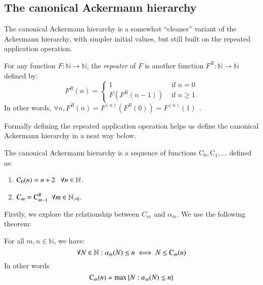 \subsection{The canonical Ackermann hierarchy}

The canonical Ackermann hierarchy is a somewhat ``cleaner'' 
variant of the Ackermann hierarchy, with simpler initial 
values, but still built on the repeated application operation.

\begin{defn} \label{defn: rep_app}
For any function $F: \mathbb{N} \to \mathbb{N}$, the 
\textit{repeater} of $F$ is another function $F^R : 
\mathbb{N} \to \mathbb{N}$ defined by:
\begin{equation}
F^R(n) = \begin{cases}
1 & \text{ if } n = 0 \\ F\left(F^R(n - 1)\right) & \text{ if } n \ge 1
\end{cases}
\end{equation}
In other words, $\forall n, F^R(n) = F^{(n)}\left(F^R(0)\right) = F^{(n)}(1) \ \ $.
\end{defn}

Formally defining the repeated application operation 
helps us define the canonical Ackermann hierarchy in 
a neat way below.

\begin{defn} \label{defn: can_ack_hier}
The canonical Ackermann hierarchy is a sequence of 
functions $\text{C}_0, \text{C}_1, \ldots $ defined as:
\begin{enumerate}
	\item $\text{C}_0(n) = n + 2 \ \ \ \forall n\in \mathbb{N}$.
	\item $\text{C}_m = \text{C}_{m-1}^R \ \ \forall m\in \mathbb{N}_{>0}$.
\end{enumerate}
\end{defn}

Firstly, we explore the relationship between $C_m$ and 
$\alpha_m$. We use the following theorem:

\begin{thm} \label{thm: inv_ack_can_ack}
For all $m, n \in \mathbb{N}$, we have:
\begin{equation} \label{eq: inv_ack_can_ack}
\forall N \in \mathbb{N}: \alpha_m(N) \le n \iff N \le \text{C}_m(n)
\end{equation}
In other words
\begin{equation} \label{eq: inv_ack_can_ack_0}
\text{C}_m(n) = \max\left\{N : \alpha_m(N) \le n\right\}
\end{equation}
\end{thm}

